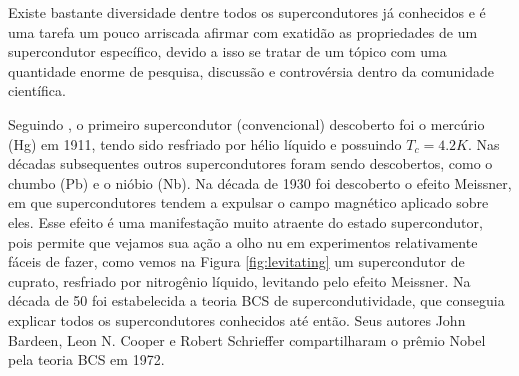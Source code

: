 \documentclass[a4paper,10pt]{article}
\begin{document}
Existe bastante diversidade dentre todos os supercondutores já conhecidos e é uma tarefa um pouco arriscada afirmar com exatidão as propriedades de um supercondutor específico, devido a isso se tratar de um tópico com uma quantidade enorme de pesquisa, discussão e controvérsia dentro da comunidade científica.

Seguindo \cite{wiki-history_superconductivity}, o primeiro supercondutor (convencional) descoberto foi o mercúrio (Hg) em 1911, tendo sido resfriado por hélio líquido e possuindo $T_c = 4.2 \unit{K}$. Nas décadas subsequentes outros supercondutores foram sendo descobertos, como o chumbo (Pb) e o nióbio (Nb). Na década de 1930 foi descoberto o efeito Meissner, em que supercondutores tendem a expulsar o campo magnético aplicado sobre eles. Esse efeito é uma manifestação muito atraente do estado supercondutor, pois permite que vejamos sua ação a olho nu em experimentos relativamente fáceis de fazer, como vemos na Figura \ref{fig:levitating} um supercondutor de cuprato, resfriado por nitrogênio líquido, levitando pelo efeito Meissner. Na década de 50 foi estabelecida a teoria BCS de supercondutividade, que conseguia explicar todos os supercondutores conhecidos até então. Seus autores John Bardeen, Leon N. Cooper e Robert Schrieffer compartilharam o prêmio Nobel pela teoria BCS em 1972.
\end{document}
